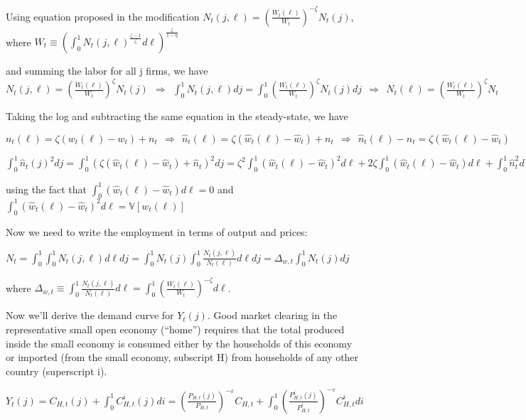\documentclass[
]{article}
\begin{document}
Using equation proposed in the modification
\(\displaystyle N_t(j,\ell)=\left(\frac{W_t(\ell)}{W_t} \right)^{-\zeta} N_t(j)\),
where
\(\displaystyle W_t \equiv \left(\int_0^1 N_t(j,\ell)^{\frac{\zeta-1}{\zeta}}d\ell\right)^{\frac{\zeta}{1-\eta}}\)

and summing the labor for all j firms, we have
\(\displaystyle N_t(j,\ell)=\left(\frac{ W_t(\ell)}{W_t}\right)^\zeta N_t(j) \ \ \Rightarrow \ \ \int_0^1N_t(j,\ell)dj= \int_0^1\left(\frac{ W_t(\ell)}{W_t}\right)^\zeta N_t(j) dj \ \ \Rightarrow \ \ N_t(\ell)=\left(\frac{ W_t(\ell)}{W_t}\right)^\zeta N_t\)

Taking the log and subtracting the same equation in the steady-state, we
have

\(\displaystyle n_t(\ell)=\zeta(w_t(\ell)-w_t) + n_t \ \ \Rightarrow \ \  \widehat{n}_t(\ell)=\zeta(\widehat{w}_t(\ell)-\widehat{w}_t) + n_t \ \ \Rightarrow \ \ \widehat{n}_t(\ell) - n_t=\zeta(\widehat{w}_t(\ell)-\widehat{w}_t)\)

\(\displaystyle \int_0^1 \widehat{n}_t(j)^2 dj = \int_0^1 (\zeta(\widehat{w}_t(\ell)-\widehat{w}_t)+\widehat{n}_t)^2 dj = \zeta^2\int_0^1(\widehat{w}_t(\ell)-\widehat{w}_t)^2d\ell + 2 \zeta \int_0^1 (\widehat{w}_t(\ell)-\widehat{w}_t) d\ell + \int_0^1 \widehat{n}_t^2 d\ell = \widehat{n}_t^2+ \zeta^2 \mathbb{V}[w_t(\ell)]\)

using the fact that
\(\int_0^1 (\widehat{w}_t(\ell)-\widehat{w}_t) d\ell=0\) and
\(\int_0^1 (\widehat{w}_t(\ell)-\widehat{w}_t)^2 d\ell=\mathbb{V}[w_t(\ell)]\)

Now we need to write the employment in terms of output and prices:

\(\displaystyle N_t=\int_0^1 \int_0^1 N_t(j,\ell)d\ell dj = \int_0^1N_t(j) \int_0^1 \frac{N_t(j,\ell)}{N_t(\ell)} d\ell dj = \Delta_{w,t} \int_0^1N_t(j)dj\)

where
\(\Delta_{w,t} \equiv \int_0^1 \frac{N_t(j,\ell)}{N_t(\ell)}d\ell = \int_0^1 \left(\frac{W_t(\ell)}{W_t} \right)^{-\zeta}d\ell\).

Now we'll derive the demand curve for \(Y_t(j)\). Good market clearing
in the representative small open economy (``home'') requires that the
total produced inside the small economy is consumed either by the
households of this economy or imported (from the small economy,
subscript H) from households of any other country (superscript i).

\(\displaystyle Y_t(j) = C_{H,t}(j)+\int_0^1 C_{H,t}^i(j)di = \left( \frac{P_{H,t}(j)}{P_{H,t}}\right)^{-\varepsilon}C_{H,t} + \int_0^1 \displaystyle \left( \frac{P_{H,t}^i(j)}{P_{H,t}^i}\right)^{-\varepsilon}C_{H,t}^i di\)
\end{document}
